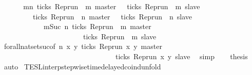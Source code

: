 \begin{isabellebody}
\ {\isacharminus}\isanewline
\ \ \isamarkupfalse%
\ {\isacartoucheopen}{\isacharbraceleft}{\isasymrho}{\isachardot}\ {\isasymforall}m{\isasymge}n{\isachardot}\ ticks\ {\isacharparenleft}{\isacharparenleft}Rep{\isacharunderscore}run\ {\isasymrho}{\isacharparenright}\ m\ master{\isacharparenright}\ {\isasymlongrightarrow}\ {\isasymnot}\ ticks\ {\isacharparenleft}{\isacharparenleft}Rep{\isacharunderscore}run\ {\isasymrho}{\isacharparenright}\ m\ slave{\isacharparenright}{\isacharbraceright}\isanewline
\ \ \ \ \ \ \ {\isacharequal}\ {\isacharbraceleft}{\isasymrho}{\isachardot}\ ticks\ {\isacharparenleft}{\isacharparenleft}Rep{\isacharunderscore}run\ {\isasymrho}{\isacharparenright}\ n\ master{\isacharparenright}\ {\isasymlongrightarrow}\ {\isasymnot}\ ticks\ {\isacharparenleft}{\isacharparenleft}Rep{\isacharunderscore}run\ {\isasymrho}{\isacharparenright}\ n\ slave{\isacharparenright}{\isacharbraceright}\isanewline
\ \ \ \ \ \ \ \ \ \ {\isasyminter}\ {\isacharbraceleft}{\isasymrho}{\isachardot}\ {\isasymforall}m{\isasymge}Suc\ n{\isachardot}\ ticks\ {\isacharparenleft}{\isacharparenleft}Rep{\isacharunderscore}run\ {\isasymrho}{\isacharparenright}\ m\ master{\isacharparenright}\isanewline
\ \ \ \ \ \ \ \ \ \ \ \ \ \ \ \ \ \ \ \ \ {\isasymlongrightarrow}\ {\isasymnot}\ ticks\ {\isacharparenleft}{\isacharparenleft}Rep{\isacharunderscore}run\ {\isasymrho}{\isacharparenright}\ m\ slave{\isacharparenright}{\isacharbraceright}{\isacartoucheclose}\isanewline
\ \ \ \ \isamarkupfalse%
\ forall{\isacharunderscore}nat{\isacharunderscore}set{\isacharunderscore}suc{\isacharbrackleft}of\ {\isacartoucheopen}n{\isacartoucheclose}\ {\isacartoucheopen}{\isasymlambda}x\ y{\isachardot}\ ticks\ {\isacharparenleft}{\isacharparenleft}Rep{\isacharunderscore}run\ x{\isacharparenright}\ y\ master{\isacharparenright}\isanewline
\ \ \ \ \ \ \ \ \ \ \ \ \ \ \ \ \ \ \ \ \ \ \ \ \ \ \ \ \ \ \ {\isasymlongrightarrow}\ {\isasymnot}ticks\ {\isacharparenleft}{\isacharparenleft}Rep{\isacharunderscore}run\ x{\isacharparenright}\ y\ slave{\isacharparenright}{\isacartoucheclose}{\isacharbrackright}\ \isamarkupfalse%
\ simp\isanewline
\ \ \isamarkupfalse%
\ {\isacharquery}thesis\ \isamarkupfalse%
\ auto\isanewline
{}\isamarkupfalse%
%
\endisatagproof
{\isafoldproof}%
%
\isadelimproof
\isanewline
%
\endisadelimproof
\isanewline
{}\isamarkupfalse%
\ TESL{\isacharunderscore}interp{\isacharunderscore}stepwise{\isacharunderscore}timedelayed{\isacharunderscore}coind{\isacharunderscore}unfold{\isacharcolon}\isanewline

\end{isabellebody}
